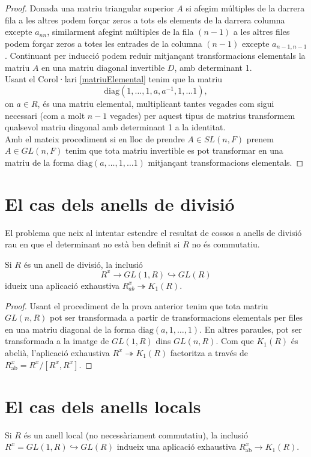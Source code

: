\begin{proof}
\indent Donada una matriu triangular superior $A$ si afegim múltiples de la darrera fila a les altres podem forçar zeros a tots els elements de la darrera columna excepte $a_{nn}$, similarment afegint múltiples de la fila $(n-1)$ a les altres files podem forçar zeros a totes les entrades de la columna $(n-1)$ excepte $a_{n-1,n-1}$. Continuant per inducció podem reduir mitjançant transformacions elementals la matriu $A$ en una matriu diagonal invertible $D$, amb determinant 1. \\
\indent Usant el Corol·lari \ref{matriuElemental} tenim que la matriu 
$$
\text{diag}(1,\dots , 1 , a, a^{-1} , 1, \dots 1),
$$
on $a\in R$, és una matriu elemental, multiplicant tantes vegades com sigui necessari (com a molt $n-1$ vegades) per aquest tipus de matrius transformem qualsevol matriu diagonal amb determinant 1 a la identitat.
\\
\indent Amb el mateix procediment si en lloc de prendre $A\in SL(n,F)$ prenem $A\in GL(n,F)$ tenim que tota matriu invertible es pot transformar en una matriu de la forma $\text{diag}(a,\dots , 1, \dots 1)$ mitjançant transformacions elementals.
\end{proof}

\section{El cas dels anells de divisió}

El problema que neix al intentar estendre el resultat de cossos a anells de divisió rau en que el determinant no està ben definit si $R$ no és commutatiu.

\begin{prop}
Si $R$ és un anell de divisió, la inclusió 
$$
R^x \rightarrow GL(1,R) \hookrightarrow GL(R)
$$ 
idueix una aplicació exhaustiva $R^x_{ab} \twoheadrightarrow K_1(R)$.
\end{prop}

\begin{proof}
Usant el procediment de la prova anterior tenim que tota matriu $GL(n,R)$ pot ser transformada a partir de transformacions elementals per files en una matriu diagonal de la forma $\text{diag}(a,1,\dots,1)$. En altres paraules, pot ser transformada a la imatge de $GL(1,R)$ dins $GL(n,R)$. Com que $K_1(R)$ és abelià, l'aplicació exhaustiva $R^x \twoheadrightarrow K_1(R)$ factoritza a través de $R^x_{\text{ab}}=R^x/[R^x,R^x]$.
\end{proof}

\section{El cas dels anells locals}
\begin{prop}\label{provaInvertibleFila}
Si $R$ és un anell local (no necessàriament commutatiu), la inclusió $R^x = GL(1,R) \hookrightarrow GL(R)$ indueix una aplicació exhaustiva $R^x_{\text{ab}}\rightarrow K_1(R)$.
\end{prop}

